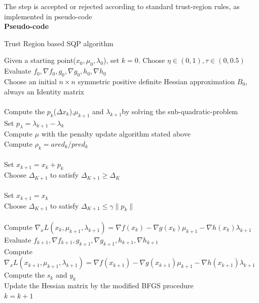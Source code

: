 The step is accepted or rejected
according to standard trust-region rules, as implemented in pseudo-code\\
\newpage
{\setmainfont{Times New Roman}\bfseries Pseudo-code}
\begin{algorithm}[H]
	\caption{ Trust Region based SQP algorithm}
	\begin{algorithmic}[1]
	    \STATE Given a starting point($x_0,\mu_0,\lambda_0$), set $k=0$. Choose $\eta \in (0,1), \tau \in (0,0.5)$\\
		\STATE Evaluate $f_0,\nabla f_0,g_0,\nabla g_0,h_0,\nabla h_0$\\
		\STATE Choose an initial $n \times n$ symmetric positive definite Hessian approximation $B_0$, always an Identity matrix\\
        \\
		\STATE Compute the $p_k$($\Delta x_k$),$\mu_{k+1}$ and $\lambda_{k+1}$by solving the sub-quadratic-problem\\
		\STATE Set $p_{\lambda}=\lambda_{k+1}-\lambda_{k}$\\
		\STATE Compute $\mu$ with the penalty update algorithm stated above\\
		\STATE Compute $\rho_k=ared_k/pred_k$\\
		\\
		\STATE Set $x_{k+1}=x_k+p_k$\\
		\STATE Choose $\Delta_{K+1}$ to satisfy $\Delta_{K+1}\ge \Delta_{K}$\\
		\ELSE\\
		\STATE Set $x_{k+1}=x_k$\\
		\STATE Choose $\Delta_{K+1}$ to satisfy $\Delta_{K+1}\le \gamma \|p_k\|$\\
		\ENDIF\\
		\STATE Compute $\nabla_{x}L\left(x_{k}, \mu_{k+1},\lambda_{k+1}\right)=\nabla f(x_k)-\nabla g(x_k)\mu_{k+1}-\nabla h(x_k)\lambda_{k+1}$\\
		\STATE Evaluate $f_{k+1},\nabla f_{k+1},g_{k+1},\nabla g_{k+1},h_{k+1},\nabla h_{k+1}$\\
		\STATE Compute $\nabla_{x}L\left(x_{k+1}, \mu_{k+1},\lambda_{k+1}\right)=\nabla f(x_{k+1})-\nabla g(x_{k+1})\mu_{k+1}-\nabla h(x_{k+1})\lambda_{k+1}$\\
		\STATE Compute the $s_k$ and $y_k$\\
		\STATE Update the Hessian matrix by the modified BFGS procedure\\
		\STATE $k=k+1$\\
		\ENDWHILE
    \end{algorithmic}
\end{algorithm}



